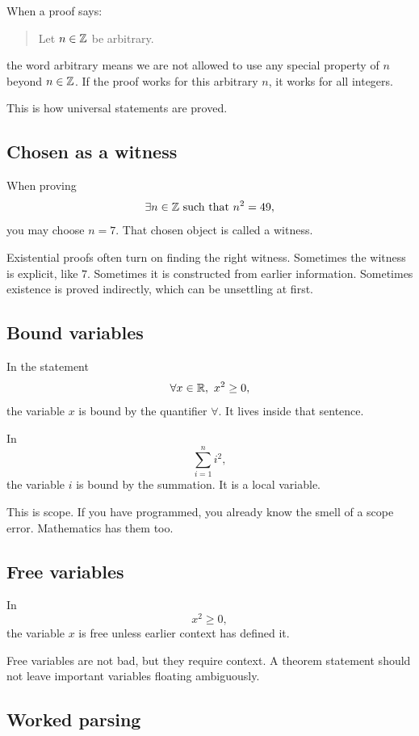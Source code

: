\documentclass[12pt]{article}
\begin{document}
When a proof says:

\begin{quote}
Let $n\in\mathbb{Z}$ be arbitrary.
\end{quote}

the word arbitrary means we are not allowed to use any special property of $n$ beyond $n\in\mathbb{Z}$. If the proof works for this arbitrary $n$, it works for all integers.

This is how universal statements are proved.

\subsection{Chosen as a witness}

When proving
\[
\exists n\in\mathbb{Z}\text{ such that }n^2=49,
\]
you may choose $n=7$. That chosen object is called a witness.

Existential proofs often turn on finding the right witness. Sometimes the witness is explicit, like $7$. Sometimes it is constructed from earlier information. Sometimes existence is proved indirectly, which can be unsettling at first.

\subsection{Bound variables}

In the statement
\[
\forall x\in\R,\ x^2\geq0,
\]
the variable $x$ is bound by the quantifier $\forall$. It lives inside that sentence.

In
\[
\sum_{i=1}^n i^2,
\]
the variable $i$ is bound by the summation. It is a local variable.

This is scope. If you have programmed, you already know the smell of a scope error. Mathematics has them too.

\subsection{Free variables}

In
\[
x^2\geq0,
\]
the variable $x$ is free unless earlier context has defined it.

Free variables are not bad, but they require context. A theorem statement should not leave important variables floating ambiguously.

\subsection{Worked parsing}
\end{document}
